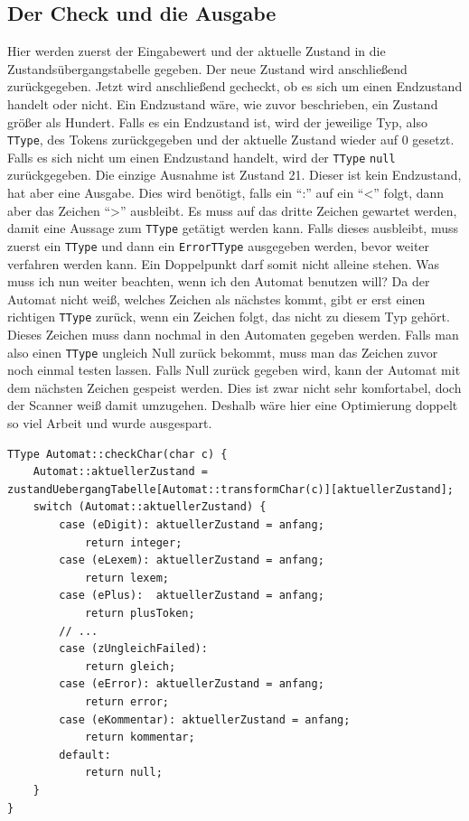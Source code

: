 \documentclass[a4paper,11pt]{report}
\begin{document}
\subsection{Der Check und die Ausgabe}
Hier werden zuerst der Eingabewert und der aktuelle Zustand in die Zustandsübergangstabelle gegeben.
Der neue Zustand wird anschließend zurückgegeben.
Jetzt wird anschließend gecheckt, ob es sich um einen Endzustand handelt oder nicht.
Ein Endzustand wäre, wie zuvor beschrieben, ein Zustand größer als Hundert.
Falls es ein Endzustand ist, wird der jeweilige Typ, also \texttt{TType}, des Tokens zurückgegeben und der aktuelle Zustand wieder auf 0 gesetzt.
Falls es sich nicht um einen Endzustand handelt, wird der \texttt{TType} \texttt{null} zurückgegeben.
Die einzige Ausnahme ist Zustand 21.
Dieser ist kein Endzustand, hat aber eine Ausgabe.
Dies wird benötigt, falls ein "`:"' auf ein "`<"' folgt, dann aber das Zeichen "`>"' ausbleibt.
Es muss auf das dritte Zeichen gewartet werden, damit eine Aussage zum \texttt{TType} getätigt werden kann.
Falls dieses ausbleibt, muss zuerst ein \texttt{TType} und dann ein \texttt{ErrorTType} ausgegeben werden, bevor weiter verfahren werden kann.
Ein Doppelpunkt darf somit nicht alleine stehen.
Was muss ich nun weiter beachten, wenn ich den Automat benutzen will?
Da der Automat nicht weiß, welches Zeichen als nächstes kommt, gibt er erst einen richtigen \texttt{TType} zurück, wenn ein Zeichen folgt, das nicht zu diesem Typ gehört.
Dieses Zeichen muss dann nochmal in den Automaten gegeben werden.
Falls man also einen \texttt{TType} ungleich Null zurück bekommt, muss man das Zeichen zuvor noch einmal testen lassen.
Falls Null zurück gegeben wird, kann der Automat mit dem nächsten Zeichen gespeist werden.
Dies ist zwar nicht sehr komfortabel, doch der Scanner weiß damit umzugehen.
Deshalb wäre hier eine Optimierung doppelt so viel Arbeit und wurde ausgespart.

\begin{lstlisting}[caption=Check und Ausgabe, label=lst:check]
TType Automat::checkChar(char c) {
	Automat::aktuellerZustand = zustandUebergangTabelle[Automat::transformChar(c)][aktuellerZustand];
	switch (Automat::aktuellerZustand) {
		case (eDigit): aktuellerZustand = anfang;
			return integer;
		case (eLexem): aktuellerZustand = anfang;
			return lexem;
		case (ePlus):  aktuellerZustand = anfang;
			return plusToken;
		// ...
		case (zUngleichFailed):
			return gleich;
		case (eError): aktuellerZustand = anfang;
			return error;
		case (eKommentar): aktuellerZustand = anfang;
			return kommentar;
		default:
			return null;
	}
}
\end{lstlisting}
\end{document}
